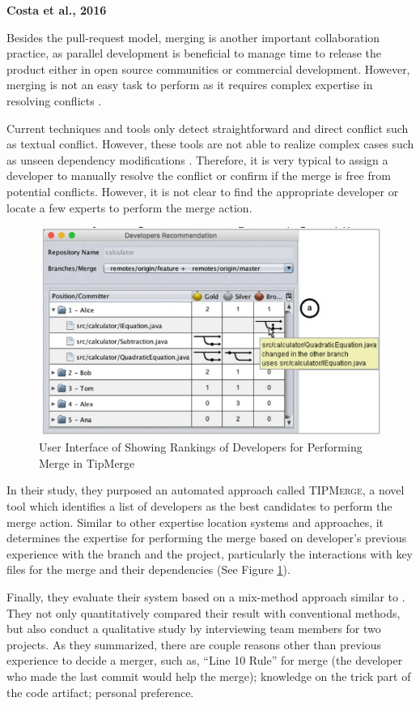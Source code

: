 \textbf{Costa et al., 2016}

Besides the pull-request model, merging is another important collaboration practice, as parallel development is beneficial to manage time to release the product either in open source communities or commercial development. However, merging is not an easy task to perform as it requires complex expertise in resolving conflicts \cite{costa2016tipmerge}. 

Current techniques and tools only detect straightforward and direct conflict such as textual conflict. However, these tools are not able to realize complex cases such as unseen dependency modifications \cite{shihab2012effect}. Therefore, it is very typical to assign a developer to manually resolve the conflict or confirm if the merge is free from potential conflicts. However, it is not clear to find the appropriate developer or locate a few experts to perform the merge action.

\begin{figure}
\includegraphics[width = 0.5\columnwidth]{TipMerge.png}
\centering
\caption{User Interface of Showing Rankings of Developers for Performing Merge in TipMerge \cite{costa2016tipmerge}}
\label{TipMerge}
\end{figure}

In their study, they purposed an automated approach called \textsc{TIPMerge}, a novel tool which identifies a list of developers as the best candidates to perform the merge action. Similar to other expertise location systems and approaches, it determines the expertise for performing the merge based on developer's previous experience with the branch and the project, particularly the interactions with key files for the merge and their dependencies (See Figure \ref{TipMerge}).

Finally, they evaluate their system based on a mix-method approach similar to \cite{yu2016reviewer}. They not only quantitatively compared their result with conventional methods, but also conduct a qualitative study by interviewing team members for two projects. As they summarized, there are couple reasons other than previous experience to decide a merger, such as, ``Line 10 Rule'' for merge (the developer who made the last commit would help the merge); knowledge on the trick part of the code artifact; personal preference.

